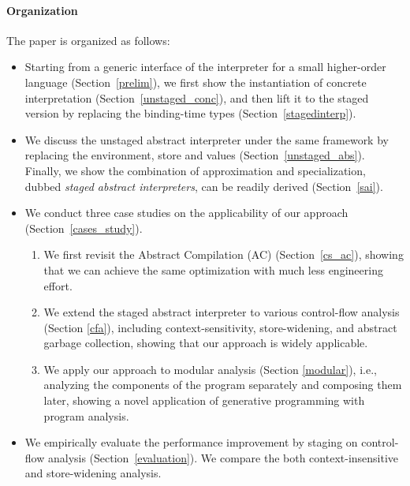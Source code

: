 \paragraph{Organization} The paper is organized as follows:
\begin{itemize}[leftmargin=2em]
\item Starting from a generic interface of the interpreter for a small higher-order language
  (Section~\ref{prelim}), we first show the instantiation of concrete
  interpretation (Section~\ref{unstaged_conc}), and then lift it to the staged
  version by replacing the binding-time types (Section~\ref{stagedinterp}).
\item We discuss the unstaged abstract interpreter under the same framework by
  replacing the environment, store and values (Section~\ref{unstaged_abs}).
  Finally, we show the combination of approximation and specialization, dubbed
  \textit{staged abstract interpreters}, can be readily derived (Section~\ref{sai}).
\item We conduct three case studies on the applicability of our approach
  (Section~\ref{cases_study}).
  \begin{enumerate}
  \item We first revisit the Abstract Compilation (AC)
    \cite{Boucher:1996:ACN:647473.727587} (Section~\ref{cs_ac}), showing that we can
    achieve the same optimization with much less engineering effort.
  \item We extend the staged abstract interpreter to various control-flow
    analysis (Section \ref{cfa}), including context-sensitivity, store-widening, and abstract
    garbage collection, showing that our approach is widely applicable.
  \item We apply our approach to modular analysis (Section \ref{modular}),
    i.e., analyzing the components of the program separately and composing them later,
    showing a novel application of generative programming with program analysis.
  \end{enumerate}
\item We empirically evaluate the performance improvement by staging on
    control-flow analysis (Section~\ref{evaluation}). We compare the both
    context-insensitive and store-widening analysis.
\end{itemize}


